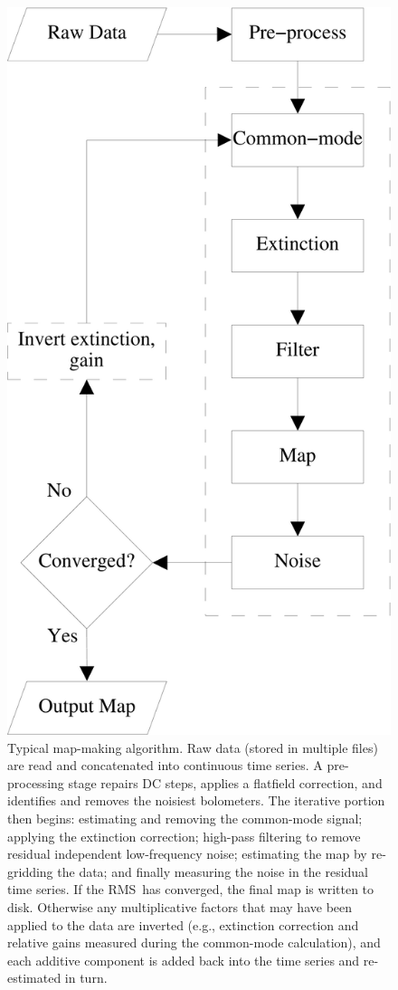 \documentclass[useAMS,usenatbib,nofootinbib]{mn2e}
\newcommand{\rms}{RMS}
\begin{document}
\begin{figure}
\centering
\includegraphics[width=0.75\linewidth]{dimm.pdf}
\caption{Typical map-making algorithm. Raw data (stored in multiple
  files) are read and concatenated into continuous time series. A
  pre-processing stage repairs DC steps, applies a flatfield
  correction, and identifies and removes the noisiest bolometers. The
  iterative portion then begins: estimating and removing the
  common-mode signal; applying the extinction correction; high-pass
  filtering to remove residual independent low-frequency noise;
  estimating the map by re-gridding the data; and finally measuring
  the noise in the residual time series. If the \rms\ has converged,
  the final map is written to disk. Otherwise any multiplicative
  factors that may have been applied to the data are inverted (e.g.,
  extinction correction and relative gains measured during the
  common-mode calculation), and each additive component is added back
  into the time series and re-estimated in turn.}
\label{fig:dimm}
\end{figure}
\end{document}
